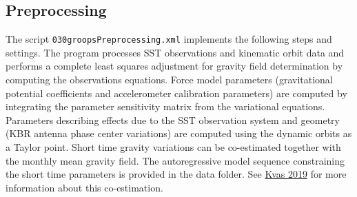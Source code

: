 \subsection{Preprocessing}\label{cookbook.gravityFieldGrace:preprocessing}
The script \verb|030groopsPreprocessing.xml| implements the following steps and settings.
The program  processes SST observations and kinematic orbit data and performs
a complete least squares adjustment for gravity field determination by computing the observations equations.
Force model parameters (gravitational potential coefficients and accelerometer calibration parameters)
are computed by integrating the parameter sensitivity matrix from the variational equations.
Parameters describing effects due to the SST observation system and geometry (KBR antenna phase
center variations) are computed using the dynamic orbits as a Taylor point.
Short time gravity variations can be co-estimated together with the monthly mean gravity field.
The autoregressive model sequence constraining the short time parameters is provided in the data folder.
See \href{https://doi.org/10.1007/s00190-019-01314-1}{Kvas 2019} for more information about
this co-estimation.
